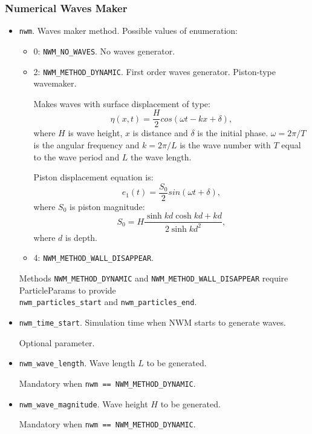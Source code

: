 \subsubsection{Numerical Waves Maker}
\begin{itemize}
    \item \verb|nwm|. Waves maker method. Possible values of enumeration:
    \begin{itemize}
        \item 0: \verb|NWM_NO_WAVES|. No waves generator.
        \item 2: \verb|NWM_METHOD_DYNAMIC|. First order waves generator. Piston-type wavemaker. 

        Makes waves with surface displacement of type:
        \begin{equation}
            \eta(x, t) = \frac{H}{2}cos(\omega t - kx + \delta),
        \end{equation}
        where $H$ is wave height, $x$ is distance and $\delta$ is the initial phase.
        $\omega = 2\pi/T$ is the angular frequency and $k=2\pi/L$ is the wave number with $T$ equal to the wave period and $L$ the wave length.

        Piston displacement equation is:
        \begin{equation}
            e_{1}(t) = \frac{S_{0}}{2} sin(\omega t + \delta),
        \end{equation}
        where $S_{0}$ is piston magnitude:
        \begin{equation}\label{eq:pistonS0}
            S_{0} = H \frac
            {\sinh{kd}\cosh{kd} + kd}
            {2\sinh{kd}^2},
        \end{equation}
        where $d$ is depth.
        
        \item 4: \verb|NWM_METHOD_WALL_DISAPPEAR|.
    \end{itemize}
    Methods \verb|NWM_METHOD_DYNAMIC| and \verb|NWM_METHOD_WALL_DISAPPEAR| require ParticleParams to provide\\ \verb|nwm_particles_start| and \verb|nwm_particles_end|.

    \item \verb|nwm_time_start|. Simulation time when NWM starts to generate waves.
    
    Optional parameter.
    \item \verb|nwm_wave_length|. Wave length $L$ to be generated.
    
    Mandatory when \verb|nwm == NWM_METHOD_DYNAMIC|.
    \item \verb|nwm_wave_magnitude|. Wave height $H$ to be generated.
    
    Mandatory when \verb|nwm == NWM_METHOD_DYNAMIC|.
\end{itemize}


